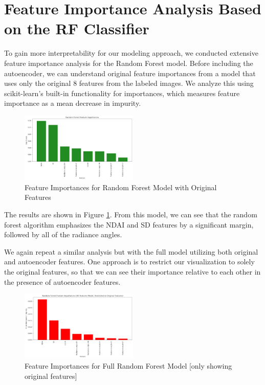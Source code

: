 \documentclass[10pt,letterpaper]{article}
\begin{document}


\section{Feature Importance Analysis Based on the RF Classifier}
To gain more interpretability for our modeling approach, we conducted extensive feature importance analysis for the Random Forest model. Before including the autoencoder, we can understand original feature importances from a model that uses only the original 8 features from the labeled images. We analyze this using scikit-learn's built-in functionality for importances, which measures feature importance as a mean decrease in impurity. 

\begin{figure}[ht]
    \centering
    \includegraphics[width=0.5\textwidth]{figs/orig_features_only_feature_importances.png}
    \caption{Feature Importances for Random Forest Model with Original Features}
    \label{fig:orig_features}
\end{figure}

The results are shown in Figure \ref{fig:orig_features}. From this model, we can see that the random forest algorithm emphasizes the NDAI and SD features by a significant margin, followed by all of the radiance angles.

We again repeat a similar analysis but with the full model utilizing both original and autoencoder features. One approach is to restrict our visualization to solely the original features, so that we can see their importance relative to each other in the presence of autoencoder features. 

\begin{figure}[ht]
    \centering
    \includegraphics[width=0.5\textwidth]{figs/full_model_restricted_feature_importances.png}
    \caption{Feature Importances for Full Random Forest Model [only showing original features]}
    \label{fig:restricted_feature_importances}
\end{figure}
\end{document}
